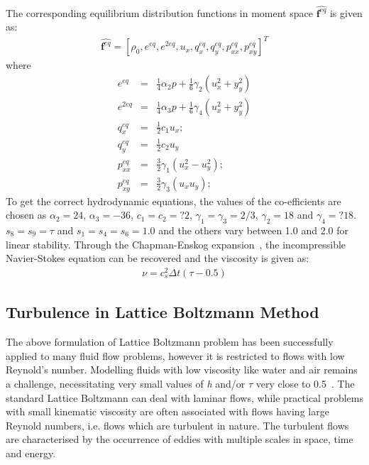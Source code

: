 The corresponding equilibrium distribution functions in moment space $\widehat{\mathbf{f}^{eq}}$ is given as:
\begin{eqnarray}
\widehat{\mathbf{f}^{eq}}=\left[\rho_0,e^{eq},e^{2eq},u_x,q_x^{eq},q_y^{eq},p_{xx}^{eq},p_{xy}^{eq}\right]^T
\end{eqnarray}
\noindent where
\begin{eqnarray}
e^{eq} & = &\frac{1}{4}\alpha_2p+\frac{1}{6}\gamma_2(u_x^2+y_y^2)\\
e^{2eq} & = & \frac{1}{4}\alpha_3p+\frac{1}{6}\gamma_4(u_x^2+y_y^2)\\
q_x^{eq} & = & \frac{1}{2}c_1u_x;\\
q_y^{eq} & = & \frac{1}{2}c_2u_y \\
p_{xx}^{eq} & = & \frac{3}{2}\gamma_1(u_x^2 - u_y^2);\\
p_{xy}^{eq} & = & \frac{3}{2}\gamma_3(u_xu_y);
\end{eqnarray}
To get the correct hydrodynamic equations, the values of the co-efficients are chosen as $\alpha_2=24$,  $\alpha_3=-36$, $c_1=c_2=?2$, $\gamma_1=\gamma_3=2/3$, $\gamma_2=18$ and $\gamma_4=?18$. $s_8 = s_9 = \tau$ and $s_1=s_4=s_6=1.0$ and the others vary between 1.0 and 2.0 for linear stability. Through the Chapman-Enskog expansion~\citep{Du2006}, the incompressible Navier-Stokes equation can be recovered and the viscosity is given as:
\begin{eqnarray}
\nu=c_s^2\Delta t(\tau-0.5)
\end{eqnarray}

\subsection{Turbulence in Lattice Boltzmann Method}
The above formulation of Lattice Boltzmann problem has been successfully applied to many fluid flow problems, however it is restricted to flows with low Reynold's number. Modelling fluids with low viscosity like water and air remains a challenge, necessitating very small values of \textit{h} and/or $\tau$ very close to 0.5~\citep{He1997}. The standard Lattice Boltzmann can deal with laminar flows, while practical problems with small kinematic viscosity are often associated with flows having large Reynold numbers, i.e. flows which are turbulent in nature. The turbulent flows are characterised by the occurrence of eddies with multiple scales in space, time and energy.

